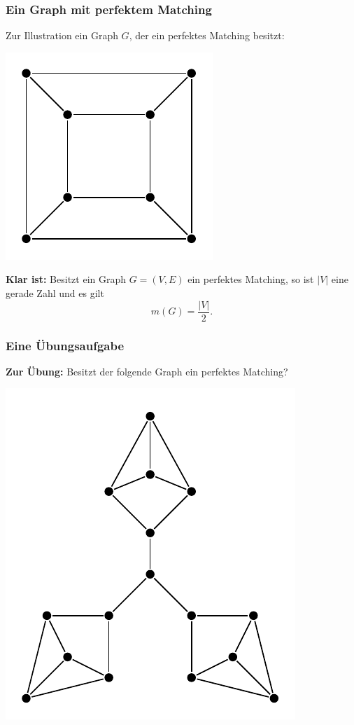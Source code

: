 \documentclass[smaller]{beamer}
\begin{document}
\begin{frame}
 \frametitle{Ein Graph mit perfektem Matching}
 Zur Illustration ein Graph $G$, der ein perfektes Matching  besitzt:

\begin{center}
 \includegraphics{fig37.pdf}
\end{center}

\textbf{Klar ist:} Besitzt ein Graph $G=(V,E)$ ein perfektes Matching, so ist $|V|$ eine gerade Zahl und es gilt
\[
m(G) = \frac{|V|}{2}.
\]
\end{frame}

\begin{frame}
\frametitle{Eine Übungsaufgabe}
\textbf{Zur Übung:} Besitzt der folgende Graph ein perfektes Matching?
\begin{center}
 \includegraphics[scale = 0.8]{fig38.pdf}
\end{center}
\end{frame}
\end{document}
